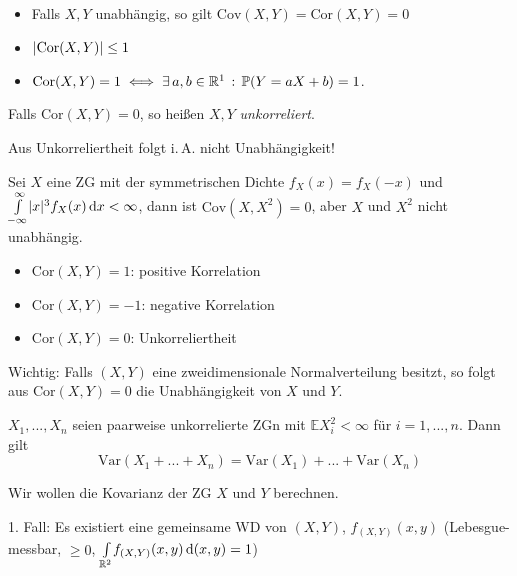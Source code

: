 \documentclass{cheat-sheet}
\renewcommand{\P}{\mathbb{P}} %
\newcommand{\E}{\mathbb{E}} %
\newcommand{\Var}{\mathrm{Var}} %
\newcommand{\cov}{\mathrm{Cov}} %
\newcommand{\cor}{\mathrm{Cor}} %
\begin{document}
\begin{satz}
  \begin{itemize}
    \item Falls $X, Y$ unabhängig, so gilt $\cov(X, Y) = \cor(X, Y) = 0$
    \item $\abs{\cor(X, Y)} \leq 1$
    \item $\cor(X, Y) = 1 \iff \exists \, a, b \in \R^1 \,:\, \P(Y = aX + b) = 1$.
  \end{itemize}
\end{satz}

\begin{defn}
  Falls $\cor(X, Y) = 0$, so heißen $X, Y$ \emph{unkorreliert}.
\end{defn}

\begin{acht}
  Aus Unkorreliertheit folgt i.\,A. nicht Unabhängigkeit!
\end{acht}

\begin{bsp}
  Sei $X$ eine ZG mit der symmetrischen Dichte $f_X(x) = f_X(-x)$ und ${\textstyle \int\limits_{-\infty}^{\infty}} \lvert x\rvert^3 f_X(x) \,\mathrm{d} x < \infty$, dann ist $\cov(X, X^2) = 0$, aber $X$ und $X^2$ nicht unabhängig.
\end{bsp}

\begin{bem}
  \begin{itemize}
    \item $\cor(X, Y) = 1$: positive Korrelation
    \item $\cor(X, Y) = -1$: negative Korrelation
    \item $\cor(X, Y) = 0$: Unkorreliertheit
  \end{itemize}
\end{bem}

Wichtig: Falls $(X, Y)$ eine zweidimensionale Normalverteilung besitzt, so folgt aus $\cor(X, Y) = 0$ die Unabhängigkeit von $X$ und $Y$.

\begin{satz}
  $X_1, ..., X_n$ seien paarweise unkorrelierte ZGn mit $\E X_i^2 < \infty$ für $i = 1, ..., n$. Dann gilt
  \[ \Var(X_1 + ... + X_n) = \Var(X_1) + ... + \Var(X_n) \]
\end{satz}



Wir wollen die Kovarianz der ZG $X$ und $Y$ berechnen.

1. Fall: Es existiert eine gemeinsame WD von $(X, Y)$, $f_{(X, Y)}(x, y)$ (Lebesgue-messbar, $\geq 0$, ${\textstyle \int\limits_{\mathbb{R}^2}^{}} f_{(X,Y)}(x,y) \,\mathrm{d} (x, y) = 1$)
\end{document}
